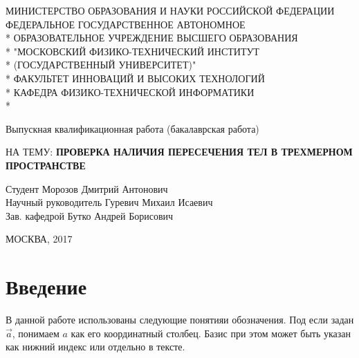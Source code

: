 \documentclass[pdftex,ptm,12pt,a4paper]{report}
\begin{document}
\begin{titlepage}
\newpage

\begin{center}{\small
МИНИСТЕРСТВО ОБРАЗОВАНИЯ И НАУКИ РОССИЙСКОЙ ФЕДЕРАЦИИ \\
\vspace{0.1cm}
ФЕДЕРАЛЬНОЕ ГОСУДАРСТВЕННОЕ АВТОНОМНОЕ  \\*
ОБРАЗОВАТЕЛЬНОЕ УЧРЕЖДЕНИЕ ВЫСШЕГО ОБРАЗОВАНИЯ \\*
"МОСКОВСКИЙ ФИЗИКО-ТЕХНИЧЕСКИЙ ИНСТИТУТ \\*
(ГОСУДАРСТВЕННЫЙ УНИВЕРСИТЕТ)" \\*
\vspace{0.1cm}
ФАКУЛЬТЕТ ИННОВАЦИЙ И ВЫСОКИХ ТЕХНОЛОГИЙ \\*
КАФЕДРА ФИЗИКО-ТЕХНИЧЕСКОЙ ИНФОРМАТИКИ \\*
\hrulefill
}
\end{center}

\begin{center}
\Large Выпускная квалификационная работа (бакалаврская работа)
\end{center}

\vspace{1em}

\begin{center}
\Large НА ТЕМУ:
\linebreak 
\textsc{\large{\textbf{ПРОВЕРКА НАЛИЧИЯ ПЕРЕСЕЧЕНИЯ ТЕЛ В ТРЕХМЕРНОМ ПРОСТРАНСТВЕ}}}
\end{center}

\vspace{4em}

\begin{flushleft}
Студент \hrulefill Морозов Дмитрий Антонович \\
Научный руководитель \hrulefill Гуревич Михаил Исаевич\\
Зав. кафедрой \hrulefill Бутко Андрей Борисович\\ 
\end{flushleft}

\vspace{\fill}

\begin{center}
МОСКВА, 2017
\end{center}

\end{titlepage}

\tableofcontents

\clearpage

\chapter{Введение}
В данной работе использованы следующие понятияи обозначения.
Под если задан $\vec{a}$, понимаем $a$ как его координатный столбец. 
Базис при этом может быть указан как нижний индекс или отдельно в тексте.
\end{document}
